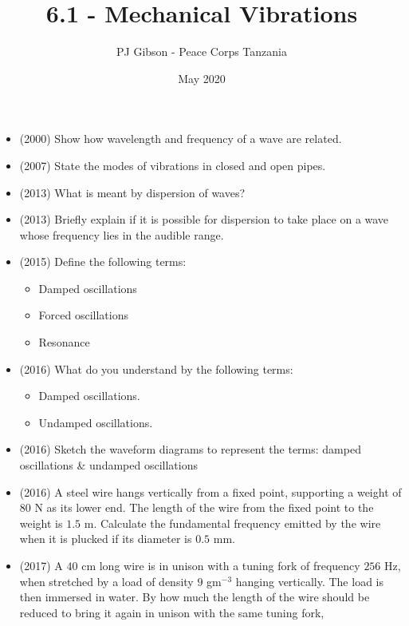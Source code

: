 \documentclass{article}
\title{\textbf{6.1 - Mechanical Vibrations}}
\author{PJ Gibson - Peace Corps Tanzania}
\date{May 2020}
\begin{document}
\maketitle

\begin{itemize}
\item (2000)  Show how wavelength and frequency of a wave are related.
\item (2007)  State the modes of vibrations in closed and open pipes.  
\item (2013)  What is meant by dispersion of waves? 
\item (2013)  Briefly explain if it is possible for dispersion to take place on a wave whose frequency lies in the audible range.
\item (2015)  Define the following terms:
 \begin{itemize}
\item Damped oscillations
\item Forced oscillations
\item Resonance
\end{itemize}
\item (2016)  What do you understand by the following terms: 
 \begin{itemize}
\item Damped oscillations. 
\item Undamped oscillations.
\end{itemize}
\item (2016)  Sketch the waveform diagrams to represent the terms: damped oscillations & undamped oscillations
\item (2016)  A steel wire hangs vertically from a fixed point, supporting a weight of $ 80$ N as its lower end.  The length of the wire from the fixed point to the weight is $ 1.5$ m.  Calculate the fundamental frequency emitted by the wire when it is plucked if its diameter is $ 0.5$ mm. 
\item (2017)  A $ 40$ cm long wire is in unison with a tuning fork of frequency $ 256$ Hz, when stretched by a load of density $ 9$ gm$ ^{-3}$ hanging vertically. The load is then immersed in water. By how much the length of the wire should be reduced to bring it again in unison with the same tuning fork,
\end{itemize}
\end{document}
